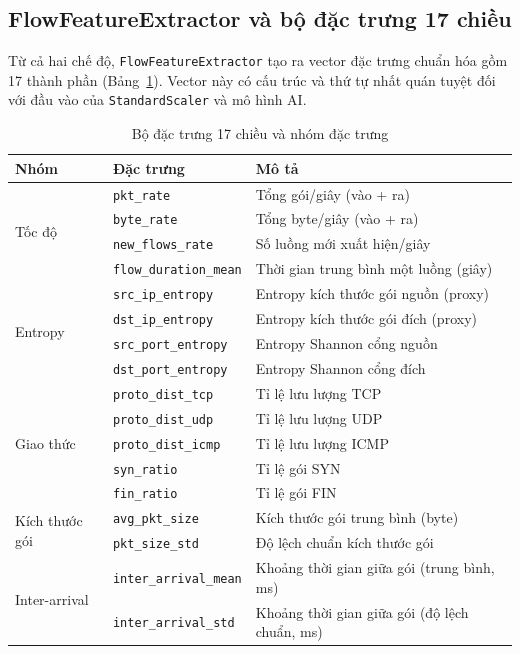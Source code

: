 \documentclass[12pt,a4paper]{article}
\begin{document}
\subsection{FlowFeatureExtractor và bộ đặc trưng 17 chiều}
\label{sec:features}

Từ cả hai chế độ, \texttt{FlowFeatureExtractor} tạo ra vector đặc trưng chuẩn hóa gồm 17 thành phần (Bảng~\ref{tab:features_groups}). Vector này có cấu trúc và thứ tự nhất quán tuyệt đối với đầu vào của \texttt{StandardScaler} và mô hình AI.

\begin{table}[H]
\centering
\caption{Bộ đặc trưng 17 chiều và nhóm đặc trưng}
\label{tab:features_groups}
\begin{tabular}{llp{7.5cm}}
\toprule
\textbf{Nhóm} & \textbf{Đặc trưng} & \textbf{Mô tả} \\
\midrule
\multirow{4}{*}{Tốc độ}
  & \texttt{pkt\_rate}           & Tổng gói/giây (vào + ra) \\
  & \texttt{byte\_rate}          & Tổng byte/giây (vào + ra) \\
  & \texttt{new\_flows\_rate}    & Số luồng mới xuất hiện/giây \\
  & \texttt{flow\_duration\_mean}& Thời gian trung bình một luồng (giây) \\
\midrule
\multirow{4}{*}{Entropy}
  & \texttt{src\_ip\_entropy}    & Entropy kích thước gói nguồn (proxy) \\
  & \texttt{dst\_ip\_entropy}    & Entropy kích thước gói đích (proxy) \\
  & \texttt{src\_port\_entropy}  & Entropy Shannon cổng nguồn \\
  & \texttt{dst\_port\_entropy}  & Entropy Shannon cổng đích \\
\midrule
\multirow{5}{*}{Giao thức}
  & \texttt{proto\_dist\_tcp}    & Tỉ lệ lưu lượng TCP \\
  & \texttt{proto\_dist\_udp}    & Tỉ lệ lưu lượng UDP \\
  & \texttt{proto\_dist\_icmp}   & Tỉ lệ lưu lượng ICMP \\
  & \texttt{syn\_ratio}          & Tỉ lệ gói SYN \\
  & \texttt{fin\_ratio}          & Tỉ lệ gói FIN \\
\midrule
\multirow{2}{*}{Kích thước gói}
  & \texttt{avg\_pkt\_size}      & Kích thước gói trung bình (byte) \\
  & \texttt{pkt\_size\_std}      & Độ lệch chuẩn kích thước gói \\
\midrule
\multirow{2}{*}{Inter-arrival}
  & \texttt{inter\_arrival\_mean}& Khoảng thời gian giữa gói (trung bình, ms) \\
  & \texttt{inter\_arrival\_std} & Khoảng thời gian giữa gói (độ lệch chuẩn, ms) \\
\bottomrule
\end{tabular}
\end{table}
\end{document}
